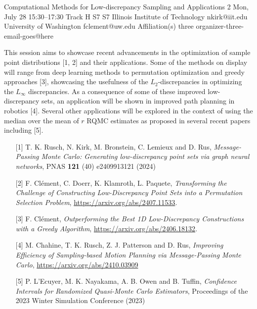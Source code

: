 \begin{talk}
  {Computational Methods for Low-discrepancy Sampling and Applications}%
  {2}%
  {}%
  {}%
  {}%
  {}%
  {Mon, July 28 15:30–17:30 Track H}%
  {S7}%
  {S7}%
  {%
    {Illinois Institute of Technology}%
    {nkirk@iit.edu}}%
  {%
	{University of Washington}%
	{fclement@uw.edu}}%
  {%
	{Affiliation(s) three}%
	{organizer-three-email-goes@here}}%

This session aims to showcase recent advancements in the optimization of sample point distributions [1, 2] and their applications. Some of the methods on display will range from deep learning methods to permutation optimization and greedy approaches [3], showcasing the usefulness of the $L_2$-discrepancies in optimizing the $L_{\infty}$ discrepancies. As a consequence of some of these improved low-discrepancy sets, an application will be shown in improved path planning in robotics [4]. Several other applications will be explored in the context of using the median over the mean of $r$ RQMC estimates as proposed in several recent papers including [5].

\medskip


\begin{enumerate}
	\item[{[1]}] T. K. Rusch, N. Kirk, M. Bronstein, C. Lemieux and D. Rus, \textit{Message-Passing Monte Carlo: Generating low-discrepancy point sets via graph neural networks}, PNAS \textbf{121} (40) e2409913121 (2024)

	\item[{[2]}] F. Clément, C. Doerr, K. Klamroth, L. Paquete, \textit{Transforming the Challenge of Constructing Low-Discrepancy Point Sets into a Permutation Selection Problem}, \url{https://arxiv.org/abs/2407.11533}.
    \item[{[3]}] F. Cl\'ement, \textit{Outperforming the Best {1D} Low-Discrepancy Constructions with a Greedy Algorithm}, \url{https://arxiv.org/abs/2406.18132}.
        \item[{[4]}] M. Chahine, T. K. Rusch, Z. J. Patterson and D. Rus, \textit{Improving Efficiency of Sampling-based Motion Planning via Message-Passing Monte Carlo}, \url{https://arxiv.org/abs/2410.03909}
        \item[{[5]}] P. L'Ecuyer, M. K. Nayakama, A. B. Owen and B. Tuffin, \textit{Confidence Intervals for Randomized Quasi-Monte Carlo Estimators}, Proceedings of the 2023 Winter Simulation Conference (2023)
\end{enumerate}


\end{talk}
